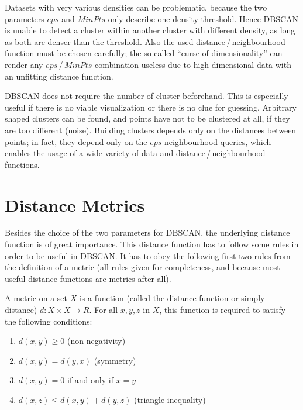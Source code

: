 Datasets with very various densities can be problematic, because the two parameters $eps$ and $MinPts$ only describe one density threshold. Hence DBSCAN is unable to detect a cluster within another cluster with different density, as long as both are denser than the threshold. Also the used distance\,/\,neighbourhood function must be chosen carefully; the so called \enquote{curse of dimensionality} can render any $eps$\,/\,$MinPts$ combination useless due to high dimensional data with an unfitting distance function.

DBSCAN does not require the number of cluster beforehand. This is especially useful if there is no viable visualization or there is no clue for guessing. Arbitrary shaped clusters can be found, and points have not to be clustered at all, if they are too different (noise). Building clusters depends only on the distances between points; in fact, they depend only on the $eps$-neighbourhood queries, which enables the usage of a wide variety of data and distance\,/\,neighbourhood functions.


\section{Distance Metrics}\label{sec:distance}
Besides the choice of the two parameters for DBSCAN, the underlying distance function is of great importance. This distance function has to follow some rules in order to be useful in DBSCAN. It has to obey the following first two rules from the definition of a metric (all rules given for completeness, and because most useful distance functions are metrics after all).

A metric on a set $X$ is a function (called the distance function or simply distance) $d : X × X → R$. For all $x, y, z$ in $X$, this function is required to satisfy the following conditions:
\begin{enumerate}
\item $d(x, y) \geq 0$ (non-negativity)%
\item $d(x, y) = d(y, x)$ (symmetry)
\item $d(x, y) = 0$ if and only if $x = y$ %
\item $d(x, z) \leq d(x, y) + d(y, z)$ (triangle inequality)%
\end{enumerate}


